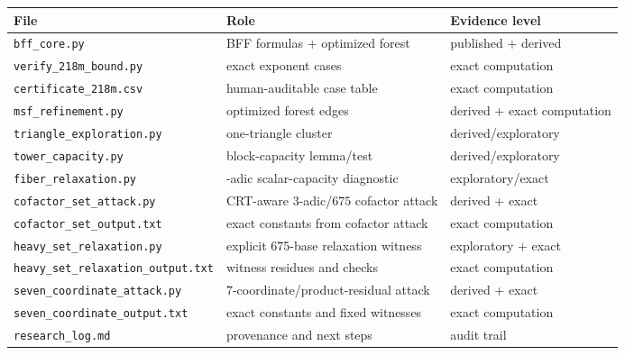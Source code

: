 \documentclass[11pt]{article}
\theoremstyle{definition}
\begin{document}
\begin{center}
\footnotesize
\begin{tabularx}{\textwidth}{@{}>{\raggedright\arraybackslash}p{}>{\raggedright\arraybackslash}X>{\raggedright\arraybackslash}p{}@{}}
\toprule
File & Role & Evidence level\\
\midrule
\texttt{bff\_core.py} & BFF formulas + optimized forest & published + derived\\
\texttt{verify\_218m\_bound.py} & 105 exact exponent cases & exact computation\\
\texttt{certificate\_218m.csv} & human-auditable case table & exact computation\\
\texttt{msf\_refinement.py} & optimized forest edges & derived + exact computation\\
\texttt{triangle\_exploration.py} & one-triangle cluster & derived/exploratory\\
\texttt{tower\_capacity.py} & block-capacity lemma/test & derived/exploratory\\
\texttt{fiber\_relaxation.py} & 3-adic scalar-capacity diagnostic & exploratory/exact\\
\texttt{cofactor\_set\_attack.py} & CRT-aware 3-adic/$675$ cofactor attack & derived + exact\\
\texttt{cofactor\_set\_output.txt} & exact constants from cofactor attack & exact computation\\
\texttt{heavy\_set\_relaxation.py} & explicit 675-base relaxation witness & exploratory + exact\\
\texttt{heavy\_set\_relaxation\_output.txt} & witness residues and checks & exact computation\\
\texttt{seven\_coordinate\_attack.py} & $7$-coordinate/product-residual attack & derived + exact\\
\texttt{seven\_coordinate\_output.txt} & exact constants and fixed witnesses & exact computation\\
\texttt{research\_log.md} & provenance and next steps & audit trail\\
\bottomrule
\end{tabularx}
\end{center}



\end{document}
